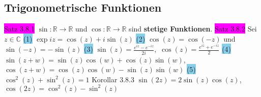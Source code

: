 \documentclass[landscape, 10pt]{article}
\newcommand{\R}{\mathbb{R}}
\newcommand{\C}{\mathbb{C}}
\begin{document}
\begin{multicols}{3}
\subsection{Trigonometrische Funktionen}
\colorbox{magenta}{Satz 3.8.1} \textcolor{NavyBlue}{$\sin:\R\longrightarrow\R$} 
                und 
                \textcolor{NavyBlue}{$\cos:\R\longrightarrow\R$} 
                sind \textbf{stetige Funktionen}.
\colorbox{magenta}{Satz 3.8.2} Sei \textcolor{NavyBlue}{$z\in\C$}
                \colorbox{SkyBlue}{(1)} \textcolor{NavyBlue}{$\exp iz=\cos(z)+i\sin(z)$} 
                \colorbox{SkyBlue}{(2)} \textcolor{NavyBlue}{$\cos(z)=\cos(-z)$} und 
                \textcolor{NavyBlue}{$\sin(-z)=-\sin(z)$}
         \colorbox{SkyBlue}{(3)} 
                \textcolor{NavyBlue}{$\sin(z)=\frac{e^{iz}-e^{-iz}}{2i}$},\,
                \textcolor{NavyBlue}{$\cos(z)=\frac{e^{iz}+e^{-iz}}{2}$} 
         \colorbox{SkyBlue}{(4)} 
                \textcolor{NavyBlue}{$\sin(z+w)=\sin(z)\cos(w)+\cos(z)\sin(w)$},\,
                \textcolor{NavyBlue}{$\cos(z+w)=\cos(z)\cos(w)-\sin(z)\sin(w)$} 
         \colorbox{SkyBlue}{(5)} \textcolor{NavyBlue}{$\cos^2(z)+\sin^2(z)=1$}
\colorbox{BurntOrange}{Korollar 3.8.3} 
                \textcolor{NavyBlue}{$\sin(2z)=2\sin(z)\cos(z)$},\,
                \textcolor{NavyBlue}{$\cos(2z)=\cos^2(z)-\sin^2(z)$}

\end{multicols}
\end{document}
